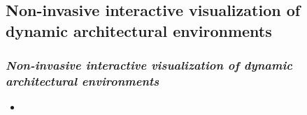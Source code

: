\subsection{Non-invasive interactive visualization of dynamic architectural environments}
\begin{frame}\frametitle{\emph{Non-invasive interactive visualization of dynamic architectural environments} \cite{641493}} 
\begin{itemize}
	\item 
\end{itemize}	
\end{frame}